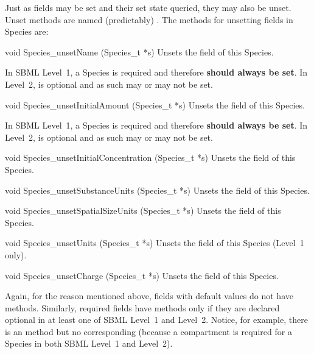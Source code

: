 \documentclass{sbmlmanual}
\begin{document}
Just as fields may be set and their set state queried, they may also be
unset.  Unset methods are named (predictably) .
The methods for unsetting fields in Species are:

\begin{methoddef}{void Species\_unsetName (Species\_t *s)}
  Unsets the  field of this Species.
  
  In SBML Level~1, a Species  is required and therefore
  \textbf{should always be set}.  In Level~2,  is optional and
  as such may or may not be set.
\end{methoddef}


\begin{methoddef}{void Species\_unsetInitialAmount (Species\_t *s)}
  Unsets the  field of this Species.
 
  In SBML Level~1, a Species  is required and
  therefore \textbf{should always be set}.  In Level~2,
   is optional and as such may or may not be set.
\end{methoddef}


\begin{methoddef}{void Species\_unsetInitialConcentration (Species\_t *s)}
  Unsets the  field of this Species.
\end{methoddef}


\begin{methoddef}{void Species\_unsetSubstanceUnits (Species\_t *s)}
  Unsets the  field of this Species.
\end{methoddef}


\begin{methoddef}{void Species\_unsetSpatialSizeUnits (Species\_t *s)}
  Unsets the  field of this Species.
\end{methoddef}


\begin{methoddef}{void Species\_unsetUnits (Species\_t *s)}
  Unsets the  field of this Species (Level~1 only).
\end{methoddef}


\begin{methoddef}{void Species\_unsetCharge (Species\_t *s)}
  Unsets the  field of this Species.
\end{methoddef}


Again, for the reason mentioned above, fields with default values do not
have  methods.  Similarly, required fields have
 methods only if they are declared optional in at least
one of SBML Level~1 and Level~2.  Notice, for example, there is an
 method but no corresponding
 (because a compartment is required for a
Species in both SBML Level~1 and Level~2).
\end{document}
